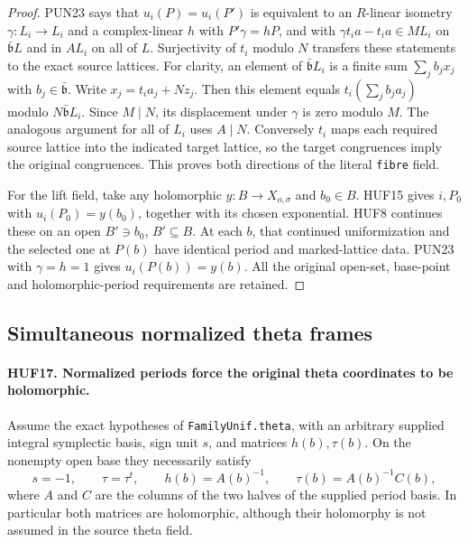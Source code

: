 \documentclass[11pt,a4paper]{article}
\numberwithin{equation}{section}
\theoremstyle{remark}\newtheorem{remark}[theorem]{Remark}
\begin{document}
\begin{proof}
PUN23 says that \(u_i(P)=u_i(P')\) is equivalent
to an \(R\)-linear isometry \(\gamma:L_i\to L_i\)
and a complex-linear \(h\) with
\(P'\gamma=hP\), and with
\(\gamma t_i a-t_i a\in ML_i\) on
\(\bar{\mathfrak b}L\) and in \(AL_i\) on
all of \(L\).
Surjectivity of \(t_i\) modulo \(N\) transfers
these statements to the exact source lattices.
For clarity, an element of
\(\bar{\mathfrak b}L_i\) is a finite sum
\(\sum_j b_jx_j\) with \(b_j\in\bar{\mathfrak b}\).
Write \(x_j=t_i a_j+N z_j\).
Then this element equals \(t_i(\sum_j b_ja_j)\)
modulo \(N\bar{\mathfrak b}L_i\).
Since \(M\mid N\), its displacement under
\(\gamma\) is zero modulo \(M\).
The analogous argument for all of \(L_i\)
uses \(A\mid N\).  Conversely \(t_i\) maps
each required source lattice into the indicated
target lattice, so the target congruences imply
the original congruences.  This proves both
directions of the literal \texttt{fibre} field.

For the lift field, take any holomorphic
\(y:B\to X_{o,\sigma}\) and \(b_0\in B\).
HUF15 gives \(i,P_0\) with \(u_i(P_0)=y(b_0)\),
together with its chosen exponential.
HUF8 continues these on an open
\(B'\ni b_0\), \(B'\subseteq B\).
At each \(b\), that continued uniformization
and the selected one at \(P(b)\) have identical
period and marked-lattice data.  PUN23 with
\(\gamma=h=1\) gives \(u_i(P(b))=y(b)\).
All the original open-set, base-point and
holomorphic-period requirements are retained.
\end{proof}

\subsection{Simultaneous normalized theta frames}

\paragraph{HUF17. Normalized periods force the original theta coordinates to be holomorphic.}
\label{claim:HUF17}
Assume the exact hypotheses of
\texttt{Family\allowbreak Unif.\allowbreak theta}, with an arbitrary supplied
integral symplectic basis, sign unit \(s\), and
matrices \(h(b),\tau(b)\).
On the nonempty open base they necessarily satisfy
\[
       s=-1,\qquad \tau=\tau^t,\qquad
       h(b)=A(b)^{-1},\qquad \tau(b)=A(b)^{-1}C(b),
 \tag{HUF.12}
\]
where \(A\) and \(C\) are the columns of the two
halves of the supplied period basis.
In particular both matrices are holomorphic,
although their holomorphy is not assumed in the
source theta field.
\end{document}
